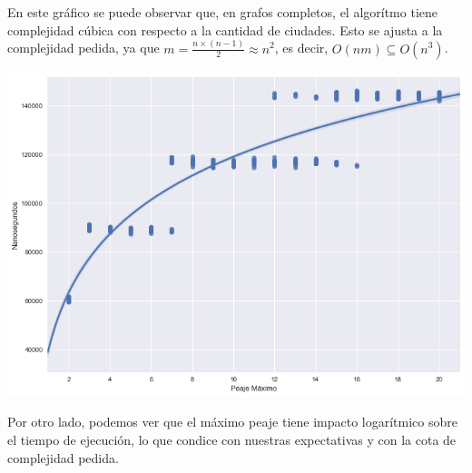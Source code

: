En este gráfico se puede observar que, en grafos completos, el algorítmo tiene complejidad cúbica con respecto a la cantidad de ciudades. Esto se ajusta a la complejidad pedida, ya que $m = \frac{n \times (n-1)}{2} \approx n^2$, es decir, $O(n m) \subseteq O(n^3)$.

\begin{center}
	\includegraphics[scale=0.5]{imagenes/ej2-2.png}
\end{center}

Por otro lado, podemos ver que el máximo peaje tiene impacto logarítmico sobre el tiempo de ejecución, lo que condice con nuestras expectativas y con la cota de complejidad pedida.
